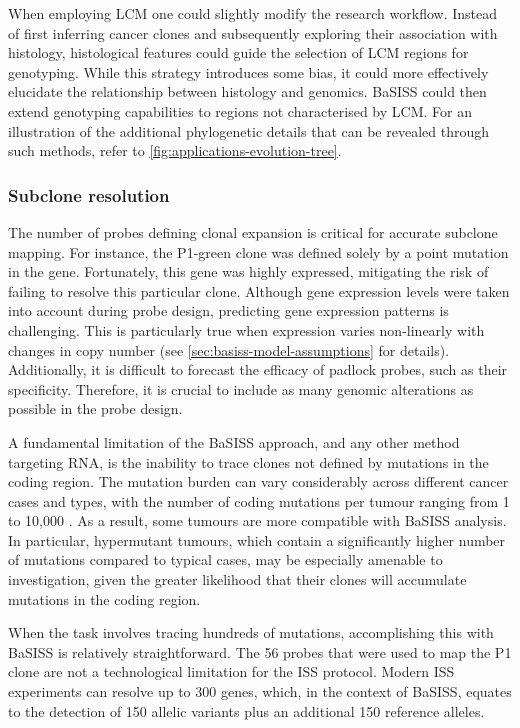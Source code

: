 When employing \ac{LCM} one could slightly modify the research workflow. Instead of first inferring cancer clones and subsequently exploring their association with histology, histological features could guide the selection of \ac{LCM} regions for genotyping. While this strategy introduces some bias, it could more effectively elucidate the relationship between histology and genomics. \ac{BaSISS} could then extend genotyping capabilities to regions not characterised by \ac{LCM}. For an illustration of the additional phylogenetic details that can be revealed through such methods, refer to \cref{fig:applications-evolution-tree}.

\subsubsection*{Subclone resolution}
The number of probes defining clonal expansion is critical for accurate subclone mapping. For instance, the P1-green clone  was defined solely by a point mutation in the  gene. Fortunately, this gene was highly expressed, mitigating the risk of failing to resolve this particular clone. Although gene expression levels were taken into account during probe design, predicting gene expression patterns is challenging. This is particularly true when expression varies non-linearly with changes in copy number (see \cref{sec:basiss-model-assumptions} for details). Additionally, it is difficult to forecast the efficacy of padlock probes, such as their specificity. Therefore, it is crucial to include as many genomic alterations as possible in the probe design.

A fundamental limitation of the \ac{BaSISS} approach, and any other method targeting RNA, is the inability to trace clones not defined by mutations in the coding region. The mutation burden can vary considerably across different cancer cases and types, with the number of coding mutations per tumour ranging from 1 to 10,000 \parencite{Martincorena2015-br}. As a result, some tumours are more compatible with \ac{BaSISS} analysis. In particular, hypermutant tumours, which contain a significantly higher number of mutations compared to typical cases, may be especially amenable to investigation, given the greater likelihood that their clones will accumulate mutations in the coding region.

When the task involves tracing hundreds of mutations, accomplishing this with \ac{BaSISS} is relatively straightforward. The 56 probes that were used to map the P1 clone are not a technological limitation for the \ac{ISS} protocol. Modern \ac{ISS} experiments can resolve up to 300 genes, which, in the context of \ac{BaSISS}, equates to the detection of 150 allelic variants plus an additional 150 reference alleles.


